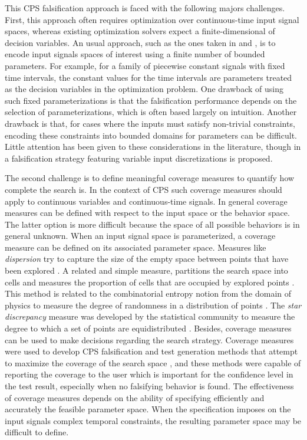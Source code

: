 This CPS falsification approach is faced with the following majors challenges.
First, this approach often
requires optimization over continuous-time input signal spaces, whereas
existing optimization solvers expect a finite-dimensional of decision variables. 
An usual approach, such as the ones taken in \cite{BreachCAV10} and 
\cite{Nghiem10}, is to encode input signals spaces of interest using a
finite number of bounded parameters. For example, for a family of
piecewise constant signals with fixed time intervals, the
constant values for the time intervals are parameters treated as the decision variables in the optimization
problem. One drawback of using such fixed parameterizations 
is that the falsification performance depends on the selection of parameterizations, 
which is often based largely on intuition. Another drawback is that, for cases where the
inputs must satisfy non-trivial constraints, encoding these constraints 
into bounded domains for parameters can be difficult. Little attention has
been given to these considerations in the literature, though in 
\cite{DBLP:conf/atva/DeshmukhJKM15} a
falsification strategy featuring variable input discretizations is proposed.

The second challenge is to define meaningful coverage measures to quantify how complete the search is. In the context of CPS such coverage measures should apply to continuous
variables and continuous-time signals. In general coverage measures can be defined with respect to the input space or the behavior space. The latter option is more difficult because the space of all possible behaviors is in general unknown. When an input signal space is parameterized, a coverage measure can be defined on its associated parameter space. Measures like \emph{dispersion} try to capture the size of the empty space between points that have been explored \cite{Esposito04}.
A related and simple measure, partitions the search space into cells and measures the proportion of cells that are occupied by explored points \cite{Skruch2011}. This method is related to the combinatorial entropy notion from the domain of physics to measure the degree of randomness in a distribution of points \cite{Gabbay06}. The \emph{star discrepancy} measure was developed by the statistical community 
to measure the degree to which a set of points are equidistributed \cite{Heinrich03}. Besides, coverage measures can be used to make decisions regarding the search strategy. Coverage measures were used to develop CPS falsification and test generation methods that attempt to maximize the coverage of the search space \cite{DangN09,Dreossi2015,CAV2017}, and these methods were capable of reporting the coverage to the user which is important for the confidence level in the test result, especially when no falsifying behavior is found. The effectiveness of coverage measures depends on the ability of specifying efficiently and accurately the feasible parameter space. When the specification imposes on the input signals complex temporal constraints, the resulting parameter space may be difficult to define. 



